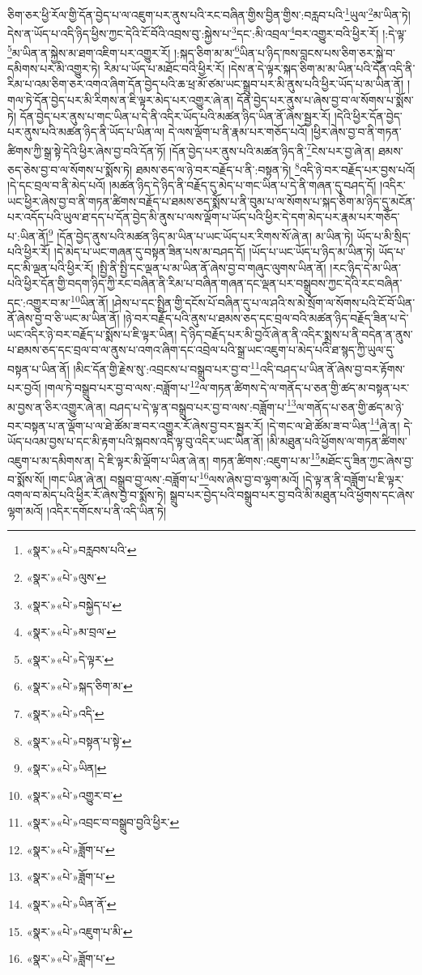 ཅིག་ཅར་ཕྱི་རོལ་གྱི་དོན་བྱེད་པ་ལ་འཇུག་པར་ནུས་པའི་རང་བཞིན་གྱིས་བྱིན་གྱིས་:བརླབ་པའི་\footnote{«སྣར་»«པེ་»བརླབས་པའི་}ཡུལ་\footnote{«སྣར་»«པེ་»ལུས་}མ་ཡིན་ཏེ། དེས་ན་ཡོད་པ་འདི་ཉིད་ཕྱིས་ཀྱང་དེའི་ངོ་བོའི་འབྲས་བུ་:སྐྱེས་པ་\footnote{«སྣར་»«པེ་»བསྐྱེད་པ་}དང་:མི་འབྲལ་\footnote{«སྣར་»«པེ་»མ་བྲལ་}བར་འགྱུར་བའི་ཕྱིར་རོ། །:དེ་ལྟ་\footnote{«སྣར་»«པེ་»དེ་ལྟར་}མ་ཡིན་ན་སྐྱེས་མ་ཐག་འཇིག་པར་འགྱུར་རོ། །:སྐད་ཅིག་མ་མ་\footnote{«སྣར་»«པེ་»སྐད་ཅིག་མ་}ཡིན་པ་ཉིད་ཁས་བླངས་པས་ཅིག་ཅར་སྐྱེ་བ་དམིགས་པར་མི་འགྱུར་ཏེ། རིམ་པ་ཡོད་པ་མཐོང་བའི་ཕྱིར་རོ། །དེས་ན་དེ་ལྟར་སྐད་ཅིག་མ་མ་ཡིན་པའི་དོན་འདི་ནི་རིམ་པ་འམ་ཅིག་ཅར་འགའ་ཞིག་དོན་བྱེད་པའི་ཆ་ཕྲ་མོ་ཙམ་ཡང་སྒྲུབ་པར་མི་ནུས་པའི་ཕྱིར་ཡོད་པ་མ་ཡིན་ནོ། །གལ་ཏེ་དོན་བྱེད་པར་མི་རིགས་ན་ཇི་ལྟར་མེད་པར་འགྱུར་ཞེ་ན། དོན་བྱེད་པར་ནུས་པ་ཞེས་བྱ་བ་ལ་སོགས་པ་སྨོས་ཏེ། དོན་བྱེད་པར་ནུས་པ་གང་ཡིན་པ་དེ་ནི་འདིར་ཡོད་པའི་མཚན་ཉིད་ཡིན་ནོ་ཞེས་སྦྱར་རོ། །དེའི་ཕྱིར་དོན་བྱེད་པར་ནུས་པའི་མཚན་ཉིད་ནི་ཡོད་པ་ཡིན་ལ། དེ་ལས་ལྡོག་པ་ནི་རྣམ་པར་གཅོད་པའོ། །ཕྱིར་ཞེས་བྱ་བ་ནི་གཏན་ཚིགས་ཀྱི་སྒྲ་སྟེ་དེའི་ཕྱིར་ཞེས་བྱ་བའི་དོན་ཏོ། །དོན་བྱེད་པར་ནུས་པའི་མཚན་ཉིད་ནི་\footnote{«སྣར་»«པེ་»འདི་}ངེས་པར་བྱ་ཞེ་ན། ཐམས་ཅད་ཅེས་བྱ་བ་ལ་སོགས་པ་སྨོས་ཏེ། ཐམས་ཅད་ལ་ཉེ་བར་བརྗོད་པ་ནི་:བསྟན་ཏེ། \footnote{«སྣར་»«པེ་»བསྟན་པ་སྟེ་}འདི་ཉེ་བར་བརྗོད་པར་བྱས་པའོ། །དེ་དང་བྲལ་བ་ནི་མེད་པའོ། །མཚན་ཉིད་དེ་ཉིད་ནི་བརྗོད་དུ་མེད་པ་གང་ཡིན་པ་དེ་ནི་གཞན་དུ་བཤད་དོ། །འདིར་ཡང་ཕྱིར་ཞེས་བྱ་བ་ནི་གཏན་ཚིགས་བརྗོད་པ་ཐམས་ཅད་སྨོས་པ་ནི་བུམ་པ་ལ་སོགས་པ་སྐད་ཅིག་མ་ཉིད་དུ་མངོན་པར་འདོད་པའི་ཡུལ་ཐ་དད་པ་དོན་བྱེད་མི་ནུས་པ་ལས་ལྡོག་པ་ཡོད་པའི་ཕྱིར་དེ་དག་མེད་པར་རྣམ་པར་གཅོད་པ་:ཡིན་ནོ།\footnote{«སྣར་»«པེ་»ཡིན།} །དོན་བྱེད་ནུས་པའི་མཚན་ཉིད་མ་ཡིན་པ་ཡང་ཡོད་པར་རིགས་སོ་ཞེ་ན། མ་ཡིན་ཏེ། ཡོད་པ་མི་སྲིད་པའི་ཕྱིར་རོ། །དེ་མེད་པ་ཡང་གཞན་དུ་བསྟན་ཟིན་པས་མ་བཤད་དོ། །ཡོད་པ་ཡང་ཡོད་པ་ཉིད་མ་ཡིན་ཏེ། ཡོད་པ་དང་མི་ལྡན་པའི་ཕྱིར་རོ། །སྤྱི་ནི་སྤྱི་དང་ལྡན་པ་མ་ཡིན་ནོ་ཞེས་བྱ་བ་གཞུང་ལུགས་ཡིན་ནོ། །རང་ཉིད་དེ་མ་ཡིན་པའི་ཕྱིར་དོན་གྱི་བདག་ཉིད་ཀྱི་རང་བཞིན་ནི་རིམ་པ་བཞིན་གཞན་དང་ལྡན་པར་བསྒྲུབས་ཀྱང་དེའི་རང་བཞིན་དང་:འགྱུར་བ་མ་\footnote{«སྣར་»«པེ་»འགྱུར་བ་}ཡིན་ནོ། །ཤེས་པ་དང་སྤྲིན་གྱི་དངོས་པོ་བཞིན་དུ་པ་ལ་ཤའི་ས་མེ་སྲོག་ལ་སོགས་པའི་ངོ་བོ་ཡིན་ནོ་ཞེས་བྱ་བ་ཅི་ཡང་མ་ཡིན་ནོ། །ཉེ་བར་བརྗོད་པའི་ནུས་པ་ཐམས་ཅད་དང་བྲལ་བའི་མཚན་ཉིད་བརྗོད་ཟིན་པ་དེ་ཡང་འདིར་ཉེ་བར་བརྗོད་པ་སྨོས་པ་ཇི་ལྟར་ཡིན། དེ་ཉིད་བརྗོད་པར་མི་བྱའོ་ཞེ་ན་ནི་འདིར་སྨྲས་པ་ནི་བདེན་ན་ནུས་པ་ཐམས་ཅད་དང་བྲལ་བ་ལ་ནུས་པ་འགའ་ཞིག་དང་འབྲེལ་པའི་སྒྲ་ཡང་འཇུག་པ་མེད་པའི་ཐ་སྙད་ཀྱི་ཡུལ་དུ་བསྟན་པ་ཡིན་ནོ། །མིང་དོན་གྱི་རྗེས་སུ་:འབྲངས་པ་བསྒྲུབ་པར་བྱ་བ་\footnote{«སྣར་»«པེ་»འབྲང་བ་བསྒྲུབ་བྱའི་ཕྱིར་}འདི་བཤད་པ་ཡིན་ནོ་ཞེས་བྱ་བར་རྟོགས་པར་བྱའོ། །གལ་ཏེ་བསྒྲུབ་པར་བྱ་བ་ལས་:བཟློག་པ་\footnote{«སྣར་»«པེ་»ཟློག་པ་}ལ་གཏན་ཚིགས་དེ་ལ་གནོད་པ་ཅན་གྱི་ཚད་མ་བསྟན་པར་མ་བྱས་ན་ཅིར་འགྱུར་ཞེ་ན། བཤད་པ་དེ་ལྟ་ན་བསྒྲུབ་པར་བྱ་བ་ལས་:བཟློག་པ་\footnote{«སྣར་»«པེ་»ཟློག་པ་}ལ་གནོད་པ་ཅན་གྱི་ཚད་མ་ཉེ་བར་བསྟན་པ་ན་ལྡོག་པ་ལ་ཐེ་ཚོམ་ཟ་བར་འགྱུར་རོ་ཞེས་བྱ་བར་སྦྱར་རོ། །དེ་གང་ལ་ཐེ་ཚོམ་ཟ་བ་ཡིན་\footnote{«སྣར་»«པེ་»ཡིན་ནོ་}ཞེ་ན། དེ་ཡོད་པའམ་བྱས་པ་དང་མི་རྟག་པའི་སྐབས་འདི་ལྟ་བུ་འདིར་ཡང་ཡིན་ནོ། །མི་མཐུན་པའི་ཕྱོགས་ལ་གཏན་ཚིགས་འཇུག་པ་མ་དམིགས་ན། དེ་ཇི་ལྟར་མི་ལྡོག་པ་ཡིན་ཞེ་ན། གཏན་ཚིགས་:འཇུག་པ་མ་\footnote{«སྣར་»«པེ་»འཇུག་པ་མི་}མཐོང་དུ་ཟིན་ཀྱང་ཞེས་བྱ་བ་སྨོས་སོ། །གང་ཡིན་ཞེ་ན། བསྒྲུབ་བྱ་ལས་:བཟློག་པ་\footnote{«སྣར་»«པེ་»ཟློག་པ་}ལས་ཞེས་བྱ་བ་ལྷག་མའོ། །དེ་ལྟ་ན་ནི་བཟློག་པ་ཇི་ལྟར་འགལ་བ་མེད་པའི་ཕྱིར་རོ་ཞེས་བྱ་བ་སྨོས་ཏེ། སྒྲུབ་པར་བྱེད་པའི་བསྒྲུབ་པར་བྱ་བའི་མི་མཐུན་པའི་ཕྱོགས་དང་ཞེས་ལྷག་མའོ། །འདིར་དགོངས་པ་ནི་འདི་ཡིན་ཏེ། 